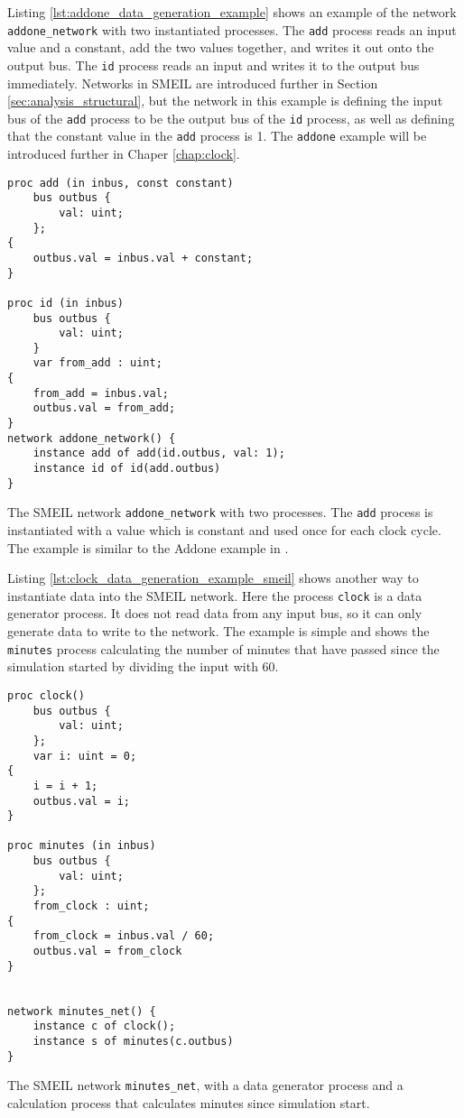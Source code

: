Listing \ref{lst:addone_data_generation_example} shows an example of the network \texttt{addone\_network} with two instantiated processes. The \texttt{add} process reads an input value and a constant, add the two values together, and writes it out onto the output bus. The \texttt{id} process reads an input and writes it to the output bus immediately. Networks in SMEIL are introduced further in Section \ref{sec:analysis_structural}, but the network in this example is defining the input bus of the \texttt{add} process to be the output bus of the \texttt{id} process, as well as defining that the constant value in the \texttt{add} process is 1.
The \texttt{addone} example will be introduced further in Chaper \ref{chap:clock}.
\begin{listing}
\begin{verbatim}
proc add (in inbus, const constant)
    bus outbus {
        val: uint;
    };
{
    outbus.val = inbus.val + constant;
}

proc id (in inbus)
    bus outbus {
        val: uint;
    }
    var from_add : uint;
{
    from_add = inbus.val;
    outbus.val = from_add;
}
network addone_network() {
    instance add of add(id.outbus, val: 1);
    instance id of id(add.outbus)
}
\end{verbatim}
\caption{The SMEIL network \texttt{addone\_network} with two processes. The \texttt{add} process is instantiated with a value which is constant and used once for each clock cycle. The example is similar to the Addone example in \cite{smeil}.}
\label{lst:addone_data_generation_example}
\end{listing}
Listing \ref{lst:clock_data_generation_example_smeil} shows another way to instantiate data into the SMEIL network. Here the process \texttt{clock} is a data generator process. It does not read data from any input bus, so it can only generate data to write to the network. The example is simple and shows the \texttt{minutes} process calculating the number of minutes that have passed since the simulation started by dividing the input with 60.\\

\begin{listing}
\begin{verbatim}
proc clock()
    bus outbus {
        val: uint;
    };
    var i: uint = 0;
{
    i = i + 1;
    outbus.val = i;
}

proc minutes (in inbus)
    bus outbus {
        val: uint;
    };
    from_clock : uint;
{
    from_clock = inbus.val / 60;
    outbus.val = from_clock
}


network minutes_net() {
    instance c of clock();
    instance s of minutes(c.outbus)
}
\end{verbatim}
\caption{The SMEIL network \texttt{minutes\_net}, with a data generator process and a calculation process that calculates minutes since simulation start.}
\label{lst:clock_data_generation_example_smeil}
\end{listing}

